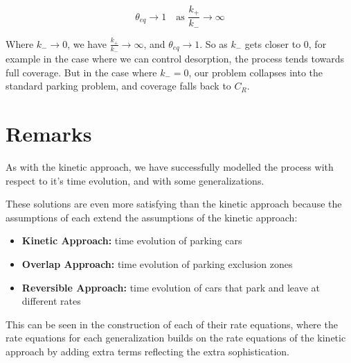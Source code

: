 \[
	\theta_{eq} \to 1 \quad \text{as } \frac{k_{+}}{k_{-}} \to \infty
\]\medskip

Where $k_{-} \to 0$, we have $\frac{k_{+}}{k_{-}} \to \infty$, and 
$\theta_{eq} \to 1$. So as $k_{-}$ gets closer to $0$, for example 
in the case where we can control desorption, the process tends towards 
full coverage. But in the case where $k_{-} = 0$, our problem collapses 
into the standard parking problem, and coverage falls back to $C_R$.











\section{Remarks}

As with the kinetic approach, we have successfully modelled the process with 
respect to it's time evolution, and with some generalizations. \bigskip

These solutions are even more satisfying than the kinetic approach because 
the assumptions of each extend the assumptions of the kinetic approach: \bigskip

\begin{itemize}
	\item \textbf{Kinetic Approach:} time evolution of parking cars
	\item \textbf{Overlap Approach:} time evolution of parking exclusion zones
	\item \textbf{Reversible Approach:} time evolution of cars that park and 
	leave at different rates
\end{itemize}\medskip

This can be seen in the construction of each of their rate equations, 
where the rate equations for each generalization builds on the rate 
equations of the kinetic approach by adding extra terms reflecting 
the extra sophistication. \bigskip










